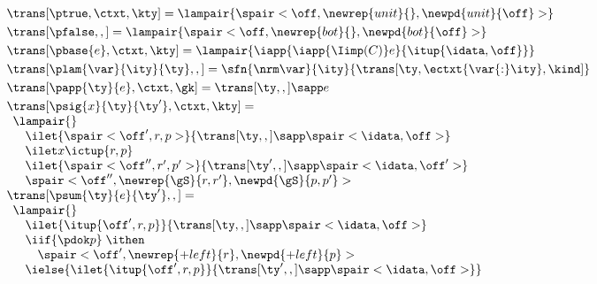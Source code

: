 \begin{figure}
\[
\begin{array}{l}
\trans[\ptrue,\ctxt,\kty] =
  \lampair{\spair<\off,\newrep{unit}{},\newpd{unit}{\off}>}
\\[3pt] %
\trans[\pfalse,,] =
  \lampair{\spair<\off,\newrep {bot}{},\newpd {bot}{\off}>}
\\[3pt] %
\trans[\pbase{e},\ctxt,\kty] =
  \lampair{\iapp {\iapp {\Iimp(C)} e} {\itup {\idata,\off}}}
\\[3pt] %
\trans[\plam{\var}{\ity}{\ty},,] =
   \sfn{\nrm\var}{\ity}{\trans[\ty,\ectxt{\var{:}\ity},\kind]}
\\[3pt] %
\trans[\papp{\ty}{e},\ctxt,\gk] =
  \trans[\ty,,] \sapp e  
\\[3pt]
\trans[\psig{x}{\ty}{\ty'},\ctxt,\kty] = \\
  \begin{array}{l}  
    \lampair{} \\
    \quad  \ilet {\spair<\off',r,p>} 
    {{\trans[\ty,,]} \sapp \spair<\idata,\off>} \\
    \quad  \ilet x {\ictup{r,p}}\\
    \quad  \ilet {\spair<\off'',r',p'>} 
    {{\trans[\ty',,]} \sapp \spair<\idata,\off'>} \\
    \quad \spair<\off'',\newrep {\gS}{r,r'},\newpd {\gS}{p,p'}>
  \end{array}  
\\
  \trans[\psum{\ty}{e}{\ty'},,] = \\
  \begin{array}{l}  
  \lampair{} \\
  \quad \ilet {\itup{\off',r,p}}{\trans[\ty,,] \sapp \spair<\idata,\off>} \\
  \quad \iif {\pdok p} \; \ithen \\
  \qquad{
    \def \r {\newrep {+left}{r}}
    \def \p {\newpd {+left}{p}}
    \spair<\off',\r,\p>} \\
  \quad \ielse {\ilet {\itup{\off',r,p}}{\trans[\ty',,] \sapp \spair<\idata,\off>}} \\
  \quad 
  {  %
}
\end{array}
\end{array}\]
\end{figure}
